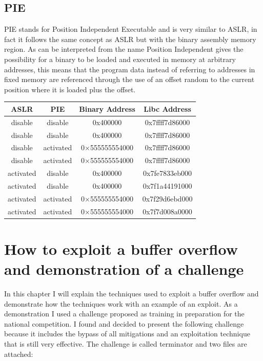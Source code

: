 \documentclass{report}
\begin{document}
    \subsection{PIE}
    PIE stands for Position Independent Executable and is very similar to ASLR, in fact it follows the same concept as ASLR but with the binary assembly memory region.\newline
    As can be interpreted from the name Position Independent gives the possibility for a binary to be loaded and executed in memory at arbitrary addresses, this means that the program data instead of referring to addresses in fixed memory are referenced through the use of an offset random to the current position where it is loaded plus the offset.
    
    \begin{table}[h] %
      \centering
      \begin{tabular}{|c|c|c|c|}
        \hline
        ASLR  & PIE & Binary Address & Libc Address \\
        \hline
        disable & disable  & 0x400000 & 0x7ffff7d86000 \\
        disable & disable  & 0x400000 & 0x7ffff7d86000\\
        disable & activated   & 0×555555554000 & 0x7ffff7d86000 \\
        disable & activated   & 0×555555554000 & 0x7ffff7d86000 \\
        activated  & disable  &  0x400000 & 0x7fe7833eb000 \\
        activated  & disable  &  0x400000& 0x7f1a44191000 \\
        activated  & activated   & 0×555555554000 & 0x7f29d6ebd000 \\
        activated  & activated   & 0×555555554000 & 0x7f7d008a0000 \\
        \hline
      \end{tabular}
    \end{table}
    \clearpage

    \section{How to exploit a buffer overflow and demonstration of a challenge}
    In this chapter I will explain the techniques used to exploit a buffer overflow and demonstrate how the techniques work with an example of an exploit.\newline
    As a demonstration I used a challenge proposed as training in preparation for the national competition.\newline
    I found and decided to present the following challenge because it includes the bypass of all mitigations and an exploitation technique that is still very effective.\newline
        The challenge is called terminator and two files are attached:
\end{document}
